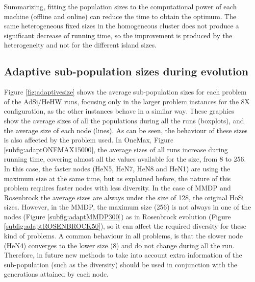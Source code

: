 \documentclass[final,1p,times]{elsarticle}
\begin{document}
 





Summarizing, fitting the population sizes to the
  computational power of each machine (offline and online) can reduce
  the time to obtain the optimum. The same heterogeneous fixed sizes
  in the homogeneous cluster does not produce a significant decrease
  of running time, so the improvement is produced by the heterogeneity
  and not for the different island sizes. 

\subsection{Adaptive sub-population sizes during evolution}

Figure \ref{fig:adaptivesize} shows the average sub-population sizes for each problem of the AdSi/HeHW runs, focusing only in the larger problem instances for the 8X configuration, as the other instances behave in a similar way. These graphics show the average sizes of all the populations during all the runs (boxplots), and the average size of each node (lines). As can be seen, the behaviour of these sizes is also affected by the problem used. In OneMax, Figure \ref{subfig:adaptONEMAX15000}, the average sizes of all runs increase during running time, covering almost all the values available for the size, from 8 to 256.  In this case, the faster nodes (HeN5, HeN7, HeN8 and HeN1) are using the maximum size at the same time, but as explained before, the nature of this problem requires faster nodes with less diversity. In the case of MMDP and Rosenbrock the average sizes are always under the size of 128, the original HoSi sizes. However, in the MMDP, the maximum size (256) is not always in one of the nodes (Figure \ref{subfig:adaptMMDP300}) as in Rosenbrock evolution (Figure \ref{subfig:adaptROSENBROCK50}), so it can affect the required diversity for these kind of problems. A common behaviour in all problems, is that the slower node (HeN4) converges to the lower size (8) and do not change during all the run. Therefore, in future new methods to take into account extra information of the sub-population (such as the diversity) should be used in conjunction with the generations attained by each node.
\end{document}
